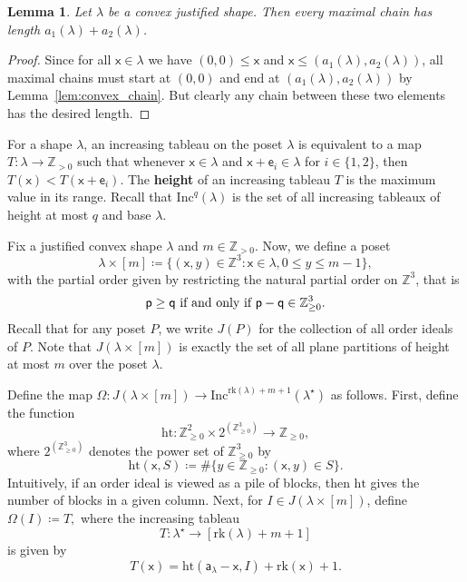 \documentclass[12pt]{amsart}
\newcommand{\x}{\ensuremath{\mathsf{x}}}
\newcommand{\e}{\ensuremath{\mathsf{e}}}
\newcommand{\aaa}{\ensuremath{\mathsf{a}}}
\newtheorem{lemma}[theorem]{Lemma}
\theoremstyle{definition}
\theoremstyle{remark}
\numberwithin{equation}{section}
\newcommand{\inc}{\ensuremath{\mathrm{Inc}}}
\newcommand{\rank}{\ensuremath{\mathrm{rk}}}
\begin{document}
\begin{lemma}\label{lem:max_chain_same}
Let $\lambda$ be a convex justified shape. Then every maximal chain has length $a_1(\lambda) + a_2(\lambda)$. 
\end{lemma}
\begin{proof} 
Since for all $\x \in \lambda$ we have $(0,0) \leq \x$ and $\x \leq (a_1(\lambda),a_2(\lambda))$, all maximal chains must start at $(0,0)$ and end at $(a_1(\lambda),a_2(\lambda))$ by Lemma~\ref{lem:convex_chain}. But clearly any chain between these two elements has the desired length.
\end{proof} 

For a shape $\lambda$, an increasing tableau on the poset $\lambda$ is equivalent to a map $T: \lambda \rightarrow \mathbb{Z}_{>0}$ such that whenever $\x \in \lambda$ and $\x+\e_i \in \lambda$ for $i \in \lbrace 1,2 \rbrace$, then $T(\x) < T(\x+\e_i)$. The {\bf height} of an increasing tableau $T$ is the maximum value in its range. Recall that $\inc^q(\lambda)$ is the set of all increasing tableaux of height at most $q$ and base $\lambda$. 

Fix a justified convex shape $\lambda$ and $m \in \mathbb{Z}_{> 0}$. Now, we define a poset
\[
\lambda \times [m] \coloneqq \{ (\x, y) \in \mathbb{Z}^3: \x \in \lambda, 0 \leq y \leq  m-1 \},
\] with the partial order given by restricting the natural partial order on $\mathbb{Z}^3$, that is
\[{\sf p} \geq {\sf q} \text{ if and only if } {\sf p}  - {\sf q} \in \mathbb{Z}_{\geq 0}^3.\]
Recall that for any poset $P$, we write $J(P)$ for the collection of all order ideals of $P$.  Note that $J(\lambda \times [m])$ is exactly the set of all plane partitions of height at most $m$ over the poset $\lambda$.

 Define the map $\Omega : J(\lambda \times [m]) \rightarrow \inc^{\rank(\lambda)+ m+1}(\lambda^\star)$ as follows. 
 First, define the function 
 \[
 \mathrm{ht}: \mathbb{Z}_{\geq 0}^2 \times 2^{(\mathbb{Z}_{\geq 0}^3)} \rightarrow \mathbb{Z}_{\geq 0},
 \] where $2^{(\mathbb{Z}_{\geq 0}^3)}$ denotes the power set of $\mathbb{Z}_{\geq 0}^3$ by 
 \[ \mathrm{ht}(\x,S) \coloneqq  \# \{ y \in \mathbb{Z}_{\geq 0} : (\x,y) \in S \}.  \]  
Intuitively, if an order ideal is viewed as a pile of blocks, then $\mathrm{ht}$ gives the number of blocks in a given column. Next, for $I \in J(\lambda \times [m])$, define $\Omega(I) \coloneqq T,$
where the increasing tableau \[T : \lambda^\star \to [\rank(\lambda) + m + 1 ] \] is given by 
\[ T( \x )= \mathrm{ht}(\aaa_\lambda - \x,I) + \rank(\x)+1.\] 
\end{document}
